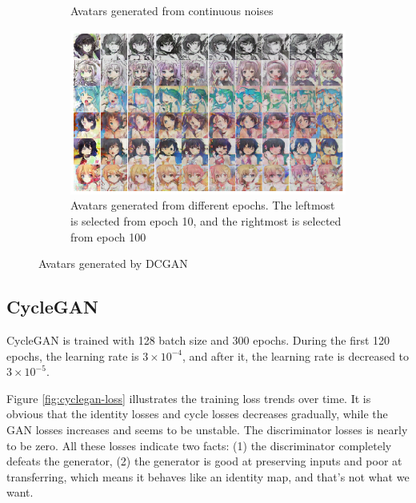 \documentclass[10pt,twocolumn,letterpaper]{article}
\begin{document}
\begin{figure}[htb]
\begin{subfigure}{.48\linewidth}
      \caption{Avatars generated from continuous noises}
   \end{subfigure}
   \begin{subfigure}{.8\linewidth}
      \centering
      \includegraphics[width=\linewidth]{dcgan-result-training.png}
      \caption{Avatars generated from different epochs. The leftmost is
      selected from epoch 10, and the rightmost is selected from epoch 100}
   \end{subfigure}
   \caption{Avatars generated by DCGAN}
   \label{fig:dcgan-examples}
\end{figure}

\subsection{CycleGAN}

CycleGAN is trained with 128 batch size and 300 epochs. During the first 120
epochs, the learning rate is $3\times 10^{-4}$, and after it, the learning rate
is decreased to $3\times 10^{-5}$.

Figure \ref{fig:cyclegan-loss} illustrates the training loss trends over time.
It is obvious that the identity losses and cycle losses decreases gradually,
while the GAN losses increases and seems to be unstable. The discriminator
losses is nearly to be zero. All these losses indicate two facts: (1)
the discriminator completely defeats the generator, (2) the generator is good at
preserving inputs and poor at transferring, which means it behaves like an
identity map, and that's not what we want.
\end{document}
